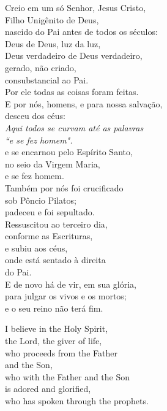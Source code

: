 \documentclass[10pt,a4]{article}
\begin{document}
\begin{paracol}{2}
\switchcolumn

Creio em um só Senhor, Jesus Cristo,\\
Filho Unigênito de Deus,  \\
nascido do Pai antes de todos os séculos: \\
Deus de Deus, luz da luz,  \\
Deus verdadeiro de Deus verdadeiro,  \\
gerado, não criado,\\
consubstancial ao Pai.  \\
Por ele todas as coisas foram feitas.  \\
E por nós, homens, e para nossa salvação, \\
desceu dos céus: \\
{\color{red}\hspace*{4em}\small \textit{Aqui todos se curvam at\'e as palavras }}\\
{\color{red}\hspace*{6em}\small \textit{``e se fez homem".}}\\
e se encarnou pelo Espírito Santo,  \\
no seio da Virgem Maria, \\
e se fez homem. \\
Também por nós foi crucificado \\
sob Pôncio Pilatos;  \\
padeceu e foi sepultado.  \\
Ressuscitou ao terceiro dia,  \\
conforme as Escrituras,  \\
e subiu aos céus,  \\
onde está sentado à direita \\
do Pai.  \\
E de novo há de vir, em sua glória,  \\
para julgar os vivos e os mortos;  \\
e o seu reino não terá fim.  \\

\switchcolumn

I believe in the Holy Spirit,\\
the Lord, the giver of life,\\
who proceeds from the Father\\
and the Son,\\
who with the Father and the Son\\
is adored and glorified,\\
who has spoken through the prophets.\\


\end{paracol}
\end{document}

